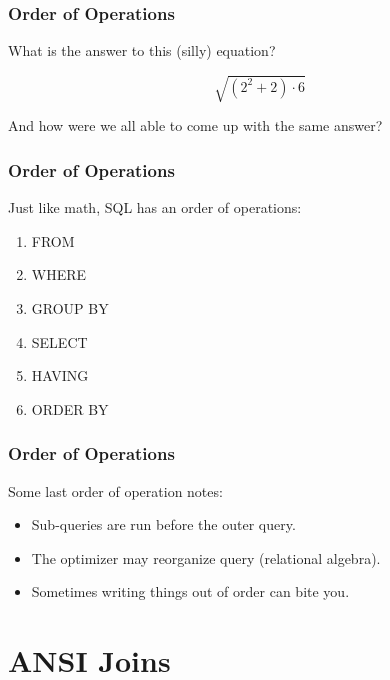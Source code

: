 \documentclass{beamer}
\begin{document}
\begin{frame} %
  \frametitle{Order of Operations}

  What is the answer to this (silly) equation?

  \bigskip
  \[\sqrt{(2^2+2) \cdot 6}\]

  \bigskip
  \pause
  And how were we all able to come up with the same answer?

\end{frame}

\begin{frame} %
  \frametitle{Order of Operations}

  Just like math, SQL has an order of operations: 

  \medskip
  \begin{enumerate}
  \item FROM
  \item WHERE
  \item GROUP BY
  \item SELECT
  \item HAVING
  \item ORDER BY
  \end{enumerate}

\end{frame}

\begin{frame} %
  \frametitle{Order of Operations}

  Some last order of operation notes:

  \bigskip
  \begin{itemize}
  \item Sub-queries are run before the outer query.
  \item The optimizer may reorganize query (relational algebra).
  \item Sometimes writing things out of order can bite you.
  \end{itemize}
  
\end{frame}

\section{ANSI  Joins} %
\end{document}
